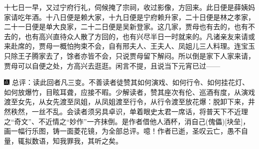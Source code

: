 十七日一早，又过宁府行礼，伺候掩了宗祠，收过影像，方回来。此日便是薛姨妈家请吃年酒。十八日便是赖大家，十九日便是宁府赖升家，二十日便是林之孝家，二十一日便是单大良家，二十二日便是吴新登家。这几家，贾母也有去的，也有不去的，也有高兴直待众人散了方回的，也有兴尽半日一时就来的。凡诸亲友来请或来赴席的，贾母一概怕拘束不会，自有邢夫人、王夫人、凤姐儿三人料理。连宝玉只除王子腾家去了，馀者亦皆不会，只说贾母留下解闷。所以倒是家下人家来请，贾母可以自便之处，方高兴去逛逛。闲言不提，且说当下元宵已过------

{\includegraphics[width=3mm]{../Images/00005}  \kaishu 总评：读此回者凡三变。不善读者徒赞其如何演戏、如何行令、如何挂花灯、如何放爆竹，目眩耳聋，应接不暇。少解读者，赞其座次有伦、巡酒有度，从演戏渡至女先，从女先渡至凤姐，从凤姐渡至行令，从行令渡至放花爆：脱卸下来，井然秩然，一丝不乱。会读者须另具卓识，单着眼史太君一席话，将普天下不近理之“奇文”、不近情之“妙作”一齐抹倒。是作者借他人酒杯，消自己{{(傀儡)}}{[}块垒{]}，画一幅行乐图，铸一面菱花镜，为全部总评。噫！作者已逝，圣叹云亡，愚不自量，辄拟数语，知我罪我，其听之矣。}
